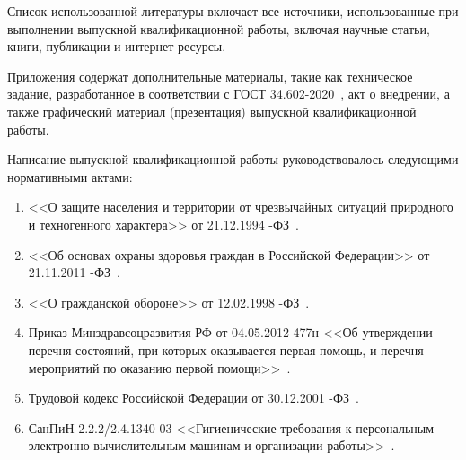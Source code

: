 Список использованной литературы включает все источники,
использованные при выполнении выпускной квалификационной работы,
включая научные статьи, книги, публикации и интернет-ресурсы.

Приложения содержат дополнительные материалы, такие как техническое задание,
разработанное в соответствии с ГОСТ 34.602-2020~\cite{gost34_602},
акт о внедрении,
а также графический материал (презентация) выпускной квалификационной работы.

Написание выпускной квалификационной работы
руководствовалось следующими нормативными актами:

\begin{enumerate}
	\item <<О защите населения и территории
		от чрезвычайных ситуаций природного
		и техногенного характера>>
		от 21.12.1994 -ФЗ~\cite{russian_emergency_law_1994}.
	\item <<Об основах охраны здоровья граждан
		в Российской Федерации>>
		от 21.11.2011 -ФЗ~\cite{healthcare_law_2011}.
	\item <<О гражданской обороне>>
		от 12.02.1998 -ФЗ~\cite{civil_defense_law_1998}.
	\item Приказ Минздравсоцразвития РФ
		от 04.05.2012 \No 477н
		<<Об утверждении перечня состояний,
		при которых оказывается первая помощь,
		и перечня мероприятий
		по оказанию первой помощи>>~\cite{first_aid_order_2012}.
	\item Трудовой кодекс Российской Федерации
		от 30.12.2001 -ФЗ~\cite{labor_code_2001}.
	\item СанПиН 2.2.2/2.4.1340-03
		<<Гигиенические требования к персональным
		электронно-вычислительным машинам
		и организации работы>>~\cite{sanpin_2003}.
\end{enumerate}

